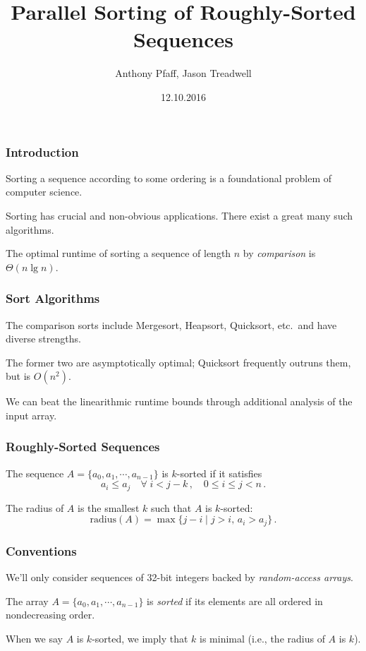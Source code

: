 \documentclass[10pt, xcolor={dvipsnames}, aspectratio=169]{beamer}
\title{Parallel Sorting of Roughly-Sorted Sequences}
\author{Anthony Pfaff, Jason Treadwell}
\institute{CSCI 5172 $|$ CU Denver $|$ Fall '16}
\date{12.10.2016}
\begin{document}

\nocite{*}
\renewcommand{\bibsection}{\subsubsection*{\bibname}}
\graphicspath{{./}}

\begin{frame}
\titlepage
\end{frame}

\begin{frame}
\transfade
\frametitle{Introduction}
Sorting a sequence according to some ordering is a foundational problem of computer science. \newline

Sorting has crucial and non-obvious applications. There exist a great many such algorithms. \newline

The optimal runtime of sorting a sequence of length $n$ by \textit{comparison} is $\Theta(n \lg n)$.
\end{frame}

\begin{frame}
\frametitle{Sort Algorithms}
The comparison sorts include Mergesort, Heapsort, Quicksort, etc.\ and have diverse strengths. \newline

The former two are asymptotically optimal; Quicksort frequently outruns them, but is $O(n^2)$. \newline

We can beat the linearithmic runtime bounds through additional analysis of the input array.
\end{frame}

\begin{frame}
\frametitle{Roughly-Sorted Sequences}
The sequence $A = \{a_0, a_1, \cdots, a_{n-1}\}$ is $k$-sorted if it satisfies
$$a_i \leq a_j \quad\forall\; i < j - k\,,\quad 0 \leq i \leq j < n \,.$$ \newline

The radius of $A$ is the smallest $k$ such that $A$ is $k$-sorted:
$$\text{radius}(A) = \max\{j - i \mid j > i,\, a_i > a_j \} \,.$$
\end{frame}

\begin{frame}
\frametitle{Conventions}
We'll only consider sequences of 32-bit integers backed by \textit{random-access arrays}. \newline

The array $A = \{a_0, a_1, \cdots, a_{n-1}\}$ is \textit{sorted} if its elements are all ordered in nondecreasing order. \newline

When we say $A$ is $k$-sorted, we imply that $k$ is minimal (i.e., the radius of $A$ is $k$).
\end{frame}
\end{document}
